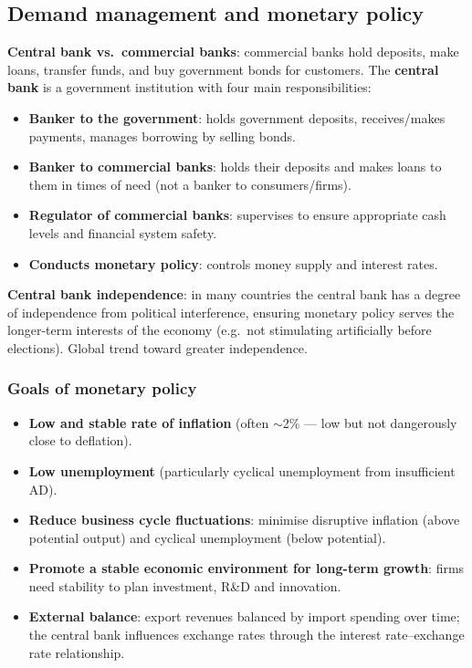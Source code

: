\subsection{Demand management and monetary policy}
\textbf{Central bank vs.\ commercial banks}: commercial banks hold deposits, make loans, transfer funds, and buy government bonds for customers. The \textbf{central bank} is a government institution with four main responsibilities:
\begin{itemize}
  \item \textbf{Banker to the government}: holds government deposits, receives/makes payments, manages borrowing by selling bonds.
  \item \textbf{Banker to commercial banks}: holds their deposits and makes loans to them in times of need (not a banker to consumers/firms).
  \item \textbf{Regulator of commercial banks}: supervises to ensure appropriate cash levels and financial system safety.
  \item \textbf{Conducts monetary policy}: controls money supply and interest rates.
\end{itemize}
\textbf{Central bank independence}: in many countries the central bank has a degree of independence from political interference, ensuring monetary policy serves the longer-term interests of the economy (e.g.\ not stimulating artificially before elections). Global trend toward greater independence.

\subsubsection*{Goals of monetary policy}
\begin{itemize}
  \item \textbf{Low and stable rate of inflation} (often $\sim$2\% --- low but not dangerously close to deflation).
  \item \textbf{Low unemployment} (particularly cyclical unemployment from insufficient AD).
  \item \textbf{Reduce business cycle fluctuations}: minimise disruptive inflation (above potential output) and cyclical unemployment (below potential).
  \item \textbf{Promote a stable economic environment for long-term growth}: firms need stability to plan investment, R\&D and innovation.
  \item \textbf{External balance}: export revenues balanced by import spending over time; the central bank influences exchange rates through the interest rate--exchange rate relationship.
\end{itemize}

